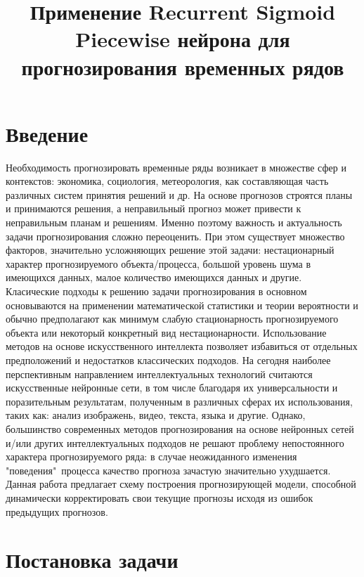 \documentclass[11pt]{article}
\title{\textbf{Применение Recurrent Sigmoid Piecewise нейрона для прогнозирования временных рядов}}
\date{}
\begin{document}
\maketitle
\thispagestyle{empty}

\section*{Введение}

Необходимость прогнозировать временные ряды возникает в множестве сфер и контекстов: экономика, социология, метеорология, как составляющая часть различных систем принятия решений и др. На основе прогнозов строятся планы и принимаются решения, а неправильный прогноз может привести к неправильным планам и решениям. Именно поэтому важность и актуальность задачи прогнозирования сложно переоценить. При этом существует множество факторов, значительно усложняющих решение этой задачи: нестационарный характер прогнозируемого объекта/процесса, большой уровень шума в имеющихся данных, малое количество имеющихся данных и другие.
\\
Класические подходы к решению задачи прогнозирования в основном основываются на применении математической статистики и теории вероятности и обычно предполагают как минимум слабую стационарность прогнозируемого объекта или некоторый конкретный вид нестационарности. Использование методов на основе искусственного интеллекта позволяет избавиться от отдельных предположений и недостатков классических подходов. На сегодня наиболее перспективным направлением интеллектуальных технологий считаются искусственные нейронные сети, в том числе благодаря их универсальности и поразительным результатам, полученным в различных сферах их использования, таких как: анализ изображень, видео, текста, языка и другие. Однако, большинство современных методов прогнозирования на основе нейронных сетей и/или других интеллектуальных подходов не решают проблему непостоянного характера прогнозируемого ряда: в случае неожиданного изменения "поведения"\ процесса качество прогноза зачастую значительно ухудшается. Данная работа предлагает схему построения прогнозирующей модели, способной динамически корректировать свои текущие прогнозы исходя из ошибок предыдущих прогнозов.

\section*{Постановка задачи}
\end{document}
